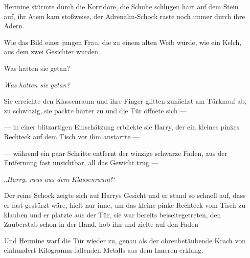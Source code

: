 \later

Hermine stürmte durch die Korridore, die Schuhe schlugen hart auf dem Stein auf, ihr Atem kam stoßweise, der Adrenalin-Schock raste noch immer durch ihre Adern.

Wie das Bild einer jungen Frau, die zu einem alten Weib wurde, wie ein Kelch, aus dem zwei Gesichter wurden.

Was hatten sie getan?

\emph{Was hatten sie getan?}

Sie erreichte den Klassenraum und ihre Finger glitten zunächst am Türknauf ab, zu schwitzig, sie packte härter zu und die Tür öffnete sich —

— in einer blitzartigen Einschätzung erblickte sie Harry, der ein kleines pinkes Rechteck auf dem Tisch vor ihm anstarrte —

— während ein paar Schritte entfernt der winzige schwarze Faden, aus der Entfernung fast unsichtbar, all das Gewicht trug —

„\emph{Harry, raus aus dem Klassenraum!}“

Der reine Schock zeigte sich auf Harrys Gesicht und er stand so schnell auf, dass er fast gestürzt wäre, hielt nur inne, um das kleine pinke Rechteck vom Tisch zu klauben und er platzte aus der Tür, sie war bereits beiseitegetreten, den Zauberstab schon in der Hand, hob ihn und zielte auf den Faden —


Und Hermine warf die Tür wieder zu, genau als der ohrenbetäubende Krach von einhundert Kilogramm fallenden Metalls aus dem Inneren erklang.

